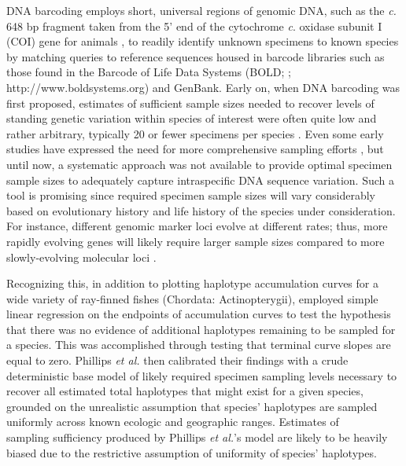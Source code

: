 DNA barcoding \cite{hebert2003biological} employs short, universal regions of genomic DNA, such as the \textit{c.} 648 bp fragment taken from the 5' end of the cytochrome \textit{c}. oxidase subunit I (COI) gene for animals \cite{hebert2003barcoding}, to readily identify unknown specimens to known species by matching queries to reference sequences housed in barcode libraries such as those found in the Barcode of Life Data Systems (BOLD; \cite{ratnasingham2007bold}; http://www.boldsystems.org) and GenBank. Early on, when DNA barcoding was first proposed,  estimates of sufficient sample sizes needed to recover levels of standing genetic variation within species of interest were often quite low and rather arbitrary, typically 20 or fewer specimens per species \cite{phillips2019incomplete, phillips2020hacsim, phillips2015exploration}. Even some early studies have expressed the need for more comprehensive sampling efforts \cite{zhang2010estimating}, but until now, a systematic approach was not available to provide optimal specimen sample sizes to adequately capture intraspecific DNA sequence variation. Such a tool is promising since required specimen sample sizes will vary considerably based on evolutionary history and life history of the species under consideration. For instance, different genomic marker loci evolve at different rates; thus, more rapidly evolving genes will likely require larger sample sizes compared to more slowly-evolving molecular loci \cite{phillips2019incomplete}. 



Recognizing this, in addition to plotting haplotype accumulation curves for a wide variety of ray-finned fishes (Chordata: Actinopterygii), \cite{phillips2015exploration} employed simple linear regression on the endpoints of accumulation curves to test the hypothesis that there was no evidence of additional haplotypes remaining to be sampled for a species. This was accomplished through testing that terminal curve slopes are equal to zero. Phillips \textit{et al.} \cite{phillips2015exploration} then calibrated their findings with a crude deterministic base model of likely required specimen sampling levels necessary to recover all estimated total haplotypes that might exist for a given species, grounded on the unrealistic assumption that species' haplotypes are sampled uniformly across known ecologic and geographic ranges. Estimates of \\ sampling sufficiency produced by Phillips \textit{et al.}'s \cite{phillips2015exploration} model are likely to be heavily biased due to the restrictive assumption of uniformity of species' haplotypes.


